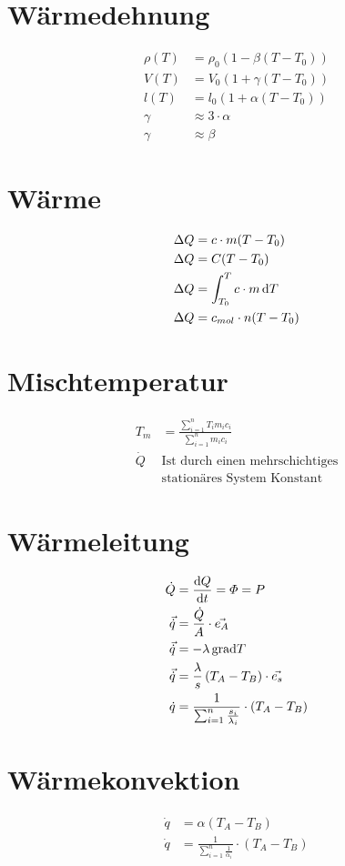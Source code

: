 \begin{multicols}{2}
\section{Wärmedehnung}
\begin{align*}
\rho(T)&=\rho_0(1-\beta(T-T_0))\\
V(T)&=V_0(1+\gamma(T-T_0))\\
l(T)&=l_0(1+\alpha(T-T_0))\\
\gamma&\approx 3\cdot \alpha\\
\gamma&\approx \beta
\end{align*}

\section{Wärme}
\begin{align*}
\Delta Q&=c\cdot m(T-T_0)\\
\Delta Q&=C(T-T_0)\\
\Delta Q&=\int_{T_0}^T c\cdot m \mathop{}\!\mathrm{d} T\\
\Delta Q&=c_{mol}\cdot n(T-T_0)
\end{align*}

\section{Mischtemperatur}
\begin{align*}
T_m&=\frac{\sum_{i=1}^n T_i m_i c_i}{\sum_{i=1}^n m_i c_i} \\
\dot{Q}&\text{Ist durch einen mehrschichtiges}\\
&\text{stationäres System Konstant}
\end{align*}

\section{Wärmeleitung}
\begin{align*}
\dot{Q}&=\frac{\mathop{}\!\mathrm{d} Q}{\mathop{}\!\mathrm{d} t}=\varPhi=P\\
\vec{\dot{q}}&=\frac{\dot{Q}}{A}\cdot\vec{e_A}\\
\vec{\dot{q}}&=-\lambda\mathop{}\!\mathrm{grad}{T}\\
\vec{\dot{q}}&=\frac{\lambda}{s}\left(T_A-T_B\right)\cdot\vec{e_s}\\
\dot{q}&=\frac{1}{\sum_{i=1}^n\frac{s_i}{\lambda_i}}\cdot\left(T_A-T_B\right)
\end{align*}

\section{Wärmekonvektion}
\begin{align*}
\dot{q}&=\alpha\left(T_A-T_B\right)\\
\dot{q}&=\frac{1}{\sum_{i=1}^n\frac{1}{\alpha_i}}\cdot\left(T_A-T_B\right)
\end{align*}
\vfill
\end{multicols}

